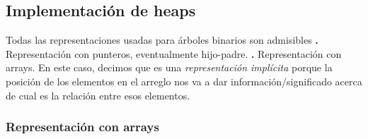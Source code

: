 \documentclass[10pt,a4paper]{article}
\begin{document}
\subsection{Implementación de heaps}
Todas las representaciones usadas para árboles binarios son admisibles
\newline
\newline
\textbf{.} Representación con punteros, eventualmente hijo-padre.
\newline
\newline
\textbf{.} Representación con arrays. En este caso, decimos que es una \textit{representación implícita} porque la posición de los elementos en el arreglo nos va a dar información/significado acerca de cual es la relación entre esos elementos.

\subsubsection{Representación con arrays}
\end{document}
